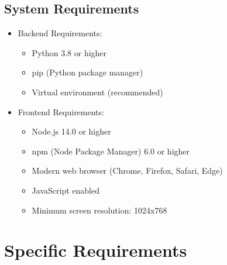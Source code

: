 \documentclass[12pt,a4paper]{article}
\begin{document}
\subsection{System Requirements}
\begin{itemize}
    \item Backend Requirements:
    \begin{itemize}
        \item Python 3.8 or higher
        \item pip (Python package manager)
        \item Virtual environment (recommended)
    \end{itemize}
    \item Frontend Requirements:
    \begin{itemize}
        \item Node.js 14.0 or higher
        \item npm (Node Package Manager) 6.0 or higher
        \item Modern web browser (Chrome, Firefox, Safari, Edge)
        \item JavaScript enabled
        \item Minimum screen resolution: 1024x768
    \end{itemize}
\end{itemize}
\newpage
\section{Specific Requirements}
\end{document}
